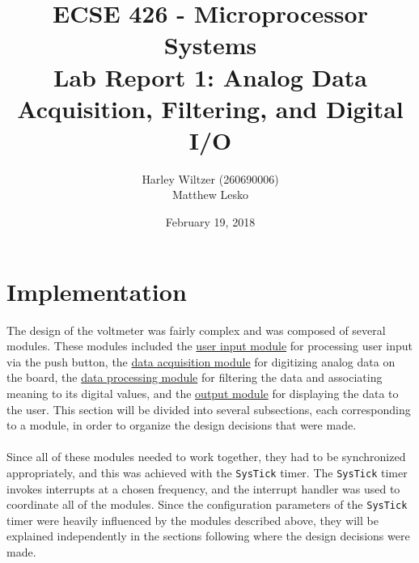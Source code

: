 \documentclass[12pt]{report}
\title{ECSE 426 - Microprocessor Systems\\Lab Report 1: Analog Data Acquisition, Filtering, and
Digital I/O}
\author{Harley Wiltzer (260690006)\\Matthew Lesko}
\date{February 19, 2018}
\begin{document}
\maketitle
\tableofcontents
\let\clearpage\relax
\listoffigures
\let\clearpage\relax
\listoftables
\newpage
\section{Implementation}
The design of the voltmeter was fairly complex and was composed of several modules.
These modules included the \hyperref[userinput]{user input module} for processing user input via the
push button, the \hyperref[dataaq]{data
acquisition module} for digitizing analog data on the board, the \hyperref[dataproc]{data processing
module} for filtering
the data and associating meaning to its digital values, and the \hyperref[output]{output module} for
displaying the
data to the user. This section will be divided into several subsections, each corresponding to a
module, in order to organize the design decisions that were made.\\\\
Since all of these modules needed to work together, they had to be synchronized
appropriately, and this was achieved with the \texttt{SysTick} timer. The \texttt{SysTick} timer
invokes interrupts at a chosen frequency, and the interrupt handler was used to coordinate all of
the modules. Since the configuration parameters of the \texttt{SysTick} timer were heavily
influenced by the modules described above, they will be explained independently in the sections
following where the design decisions were made.
\end{document}
